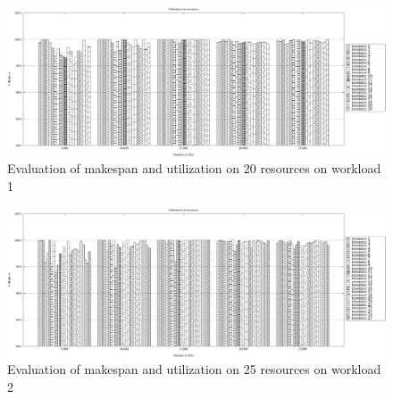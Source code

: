 \begin{figure}[!ht]
    \centering
    \includegraphics[width=1.5\textwidth,keepaspectratio,angle=90]{20res_SHARCNET}
    \caption{Evaluation of makespan and utilization on 20 resources on workload 1}
    \label{fig:20res}
\end{figure}
\begin{figure}[!ht]
     \centering
    \includegraphics[width=1.5\textwidth,keepaspectratio,angle=90]{25res_SHARCNET}
    \caption{Evaluation of makespan and utilization on 25 resources on workload 2}
    \label{fig:25res}
\end{figure}
